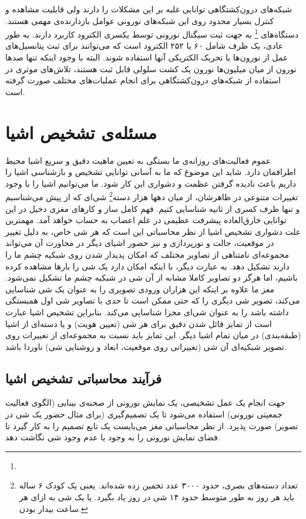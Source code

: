 شبکه‌های درون‌کشتگاهی توانایی غلبه بر این مشکلات را دارند ولی قابلیت مشاهده و کنترل بسیار محدود روی این شبکه‌های نورونی عوامل بازدارنده‌ی مهمی هستند. دستگاه‌های \footnote{} به جهت ثبت سیگنال نورونی توسط یکسری الکترود کاربرد دارند. به طور عادی، یک ظرف  شامل ۶۰ یا ۲۵۲ الکترود است که می‌توانند برای ثبت پتانسیل‌های عمل از نورون‌ها یا تحریک الکتریکی آنها استفاده شوند. البته با وجود اینکه تنها صدها نورون از میان میلیون‌ها نورون یک کشت سلولی قابل ثبت هستند، تلاش‌های موثری در استفاده از شبکه‌های درون‌کشتگاهی برای انجام عملیات‌های مختلف صورت گرفته است. 

\section{مسئله‌ی تشخیص اشیا}
عموم فعالیت‌های روزانه‌ی ما بستگی به تعیین ماهیت دقیق و سریع اشیا محیط اطرافمان دارد. شاید این موضوع که ما به آسانی توانایی تشخیص و بازشناسی اشیا را داریم باعث نادیده گرفتن عظمت و دشواری این کار شود. ما می‌توانیم اشیا را با وجود تغییرات متنوعی در ظاهرشان، از میان دهها هزار دسته\footnote{تعداد دسته‌های بصری، حدود ۳۰۰۰ عدد تخمین زده شده‌اند.\cite{biederman1987recognition} یعنی یک کودک ۶ ساله باید هر روز به طور متوسط حدود ۱۴ شی در روز یاد بگیرد. یا یک شی به ازای هر ساعت بیدار بودن.} شی‌ای که از پیش می‌شناسیم و تنها ظرف کسری از ثانیه شناسایی کنیم. فهم کامل ساز و کارهای مغزی دخیل در این توانایی خارق‌العاده پیشرفت عظیمی در علم اعصاب به حساب خواهد آمد.
مهمترین علت دشواری تشخیص اشیا از نظر محاسباتی این است که هر شی خاص، به دلیل تغییر در موقعیت، حالت و نورپردازی و نیز حضور اشیای دیگر در مجاورت آن می‌تواند مجموعه‌ای نامتناهی از تصاویر مختلف که امکان پدیدار شدن روی شبکیه چشم ما را دارند تشکیل دهد. به عبارت دیگر، با اینکه امکان دارد یک شی را بارها مشاهده کرده باشیم، اما هرگز دو تصاویر کاملا مشابه از آن شی در شبکیه چشم ما تشکیل نمی‌شود. مغز ما علاوه بر اینکه این هزاران ورودی تصویری را به عنوان یک شی شناسایی می‌کند، تصویر شی دیگری را که حتی ممکن است تا حدی با تصاویر شی اول همبستگی داشته باشد را به عنوان شی‌ای مجزا شناسایی می‌کند.
بنابراین تشخیص اشیا عبارت است از تمایز قائل شدن دقیق برای هر شی (تعیین هویت) و یا دسته‌ای از اشیا (طبقه‌بندی) در میان تمام اشیا دیگر. این تمایز باید نسبت به مجموعه‌ای از تغییرات روی تصویر شبکیه‌ای آن شی (تغییراتی روی موقعیت، ابعاد و روشنایی شی) ناوردا باشد. 

\subsection{فرآیند محاسباتی تشخیص اشیا}
جهت انجام یک عمل تشخیصی، یک نمایش نورونی از صحنه‌ی بینایی (الگوی فعالیت جمعیتی نورونی) استفاده می‌شود تا یک تصمیم‌گیری (برای مثال حضور یک شی در تصویر) صورت پذیرد. از نظر محاسباتی مغز می‌بایست یک تابع تصمیم را به کار گیرد تا فضای نمایش نورونی را به وجود یا عدم وجود شی نگاشت دهد.

